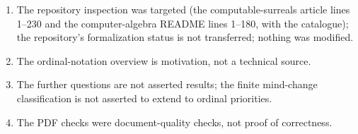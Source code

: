 \documentclass[11pt,oneside]{article}
\numberwithin{equation}{section}
\theoremstyle{definition}
\theoremstyle{remark}
\begin{document}
\begin{enumerate}[leftmargin=*,widest=00,label=08.\arabic*]
audit) was found and fixed; the record reports only the final run, not that no
intermediate test failed; the lemma itself did not rely on the erroneous code.
\item The repository inspection was targeted (the computable-surreals article
lines 1--230 and the computer-algebra README lines 1--180, with the catalogue); the
repository's formalization status is not transferred; nothing was modified.
\item The ordinal-notation overview is motivation, not a technical source.
\item The further questions are not asserted results; the finite mind-change
classification is not asserted to extend to ordinal priorities.
\item The PDF checks were document-quality checks, not proof of correctness.
\end{enumerate}
\end{document}

